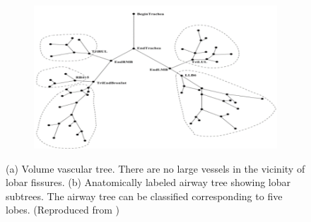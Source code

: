 \begin{figure}[htbp]
\begin{subfigure}{.43\linewidth}
  \includegraphics[width=\linewidth,trim={{.0\wd0} {.0\wd0} {.0\wd0} {.0\wd0}},clip]{Segmentation/Image/LabelledAirwayTree.png}
  \caption{}
  \label{fig:AnatomicalBasedSegmentation-b} 
\end{subfigure}
\caption{(a) Volume vascular tree. There are no large vessels in the vicinity of lobar fissures. (b) Anatomically labeled airway tree showing lobar subtrees. The airway tree can be classified corresponding to five lobes. (Reproduced from \citep{ukil2009anatomy})}
\label{fig:AnatomicalBasedSegmentation}
\end{figure}

